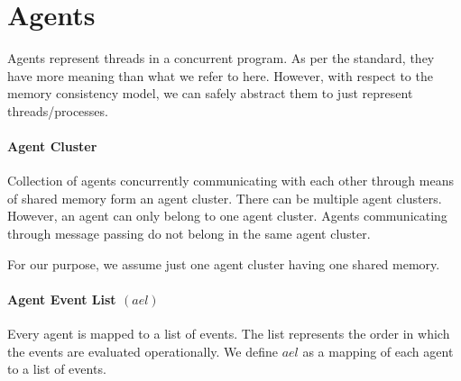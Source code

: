 \section{Agents}

    Agents represent threads in a concurrent program. As per the standard, they have more meaning than what we refer to here. However, with respect to the memory consistency model, we can safely abstract them to just represent threads/processes.

    \paragraph{Agent Cluster}
        Collection of agents concurrently communicating with each other through means of shared memory form an agent cluster.  There can be multiple agent clusters. However, an agent can only belong to one agent cluster. Agents communicating through message passing do not belong in the same agent cluster. 

        For our purpose, we assume just one agent cluster having one shared memory. 

    \paragraph{Agent Event List $(ael)$}
        Every agent is mapped to a list of events. The list represents the order in which the events are evaluated operationally\footnotemark. We define $ael$ as a mapping of each agent to a list of events.
        

        

            

